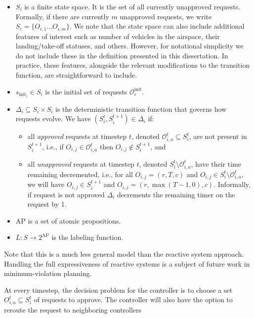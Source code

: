 \begin{itemize}
    \item $S_i$ is a finite state space.  It is the set of all currently unapproved requests. Formally, if there are currently $m$ unapproved requests, we write $S_i = \{O_{i,1} \dots O_{i,m}\}$. We note that the state space can also include additional features of interest such as number of vehicles in the airspace, their landing/take-off statuses, and others. However, for notational simplicity we do not include these in the definition presented in this dissertation. In practice, these features, alongside the relevant modifications to the transition function, are straightforward to include. 
    \item $s_{\text{init}_i} \in S_i$ is the initial set of requests $\mathcal{O}^{\text{init}}_i$.
    \item $\Delta_i \subseteq S_i \times S_i$ is the deterministic transition function that governs how requests evolve. We have $\left(S^t_i,S^{t+1}_i \right) \in \Delta_i$ if:

    \begin{itemize}
        \item all \emph{approved} requests at timestep $t$, denoted $\mathcal O_{i,a}^t \subseteq S^t_i$,  are not present in $S^{t+1}_i$, i.e., if $O_{i,j} \in  \mathcal O_{i,a}^t$ then $O_{i,j} \notin S^{t+1}_i$, and
        \item all \emph{unapproved} requests at timestep $t$, denoted $S^{t}_i \setminus \mathcal O_{i,a}^t$, have their time remaining decremented, i.e., for all $O_{i,j} = (r,T,c)$ and $O_{i,j} \in S^{t}_i \setminus \mathcal{O}_{i,a}^t$, we will have $O_{i,j} \in S^{t+1}_i$ and $O_{i,j} = (r,\max(T-1,0),c)$. Informally, if request is not approved $\Delta_i$ decrements the remaining timer on the request by 1. 
    \end{itemize}
    \item $\text{AP}$ is a set of atomic propositions.
    \item  $L:S\rightarrow 2^{\text{AP}}$ is the labeling function.
\end{itemize}

Note that this is a much less general model than the reactive system approach. Handling the full expressiveness of reactive systems is a subject of future work in minimum-violation planning. 

At every timestep, the decision problem for the controller is to choose a set $O_{i,a}^t \subseteq S^{t}_i$ of requests to approve. The controller will also have the option to reroute the request to neighboring controllers

